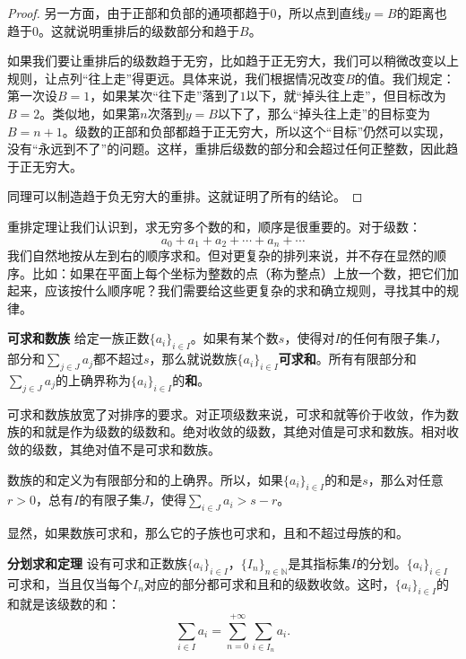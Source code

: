\documentclass[12pt,UTF8]{ctexbook}
\begin{document}
\begin{proof}
    另一方面，由于正部和负部的通项都趋于$0$，所以点到直线$y = B$的距离也趋于$0$。这就说明重排后的级数部分和趋于$B$。

    如果我们要让重排后的级数趋于无穷，比如趋于正无穷大，我们可以稍微改变以上规则，让点列“往上走”得更远。具体来说，我们根据情况改变$B$的值。我们规定：第一次设$B = 1$，如果某次“往下走”落到了$1$以下，就“掉头往上走”，但目标改为$B=2$。类似地，如果第$n$次落到$y = B$以下了，那么“掉头往上走”的目标变为$B = n + 1$。级数的正部和负部都趋于正无穷大，所以这个“目标”仍然可以实现，没有“永远到不了”的问题。这样，重排后级数的部分和会超过任何正整数，因此趋于正无穷大。

    同理可以制造趋于负无穷大的重排。这就证明了所有的结论。

\end{proof}

重排定理让我们认识到，求无穷多个数的和，顺序是很重要的。对于级数：
$$ a_0 + a_1 + a_2 + \cdots + a_n + \cdots $$
我们自然地按从左到右的顺序求和。但对更复杂的排列来说，并不存在显然的顺序。比如：如果在平面上每个坐标为整数的点（称为整点）上放一个数，把它们加起来，应该按什么顺序呢？我们需要给这些更复杂的求和确立规则，寻找其中的规律。

\begin{df}{\textbf{可求和数族}}
    给定一族正数$\{a_i\}_{i\in I}$。如果有某个数$s$，使得对$I$的任何有限子集$J$，部分和$\sum_{j\in J} a_j$都不超过$s$，那么就说数族$\{a_i\}_{i\in I}$\textbf{可求和}。所有有限部分和$\sum_{j\in J} a_j$的上确界称为$\{a_i\}_{i\in I}$的\textbf{和}。
\end{df}

可求和数族放宽了对排序的要求。对正项级数来说，可求和就等价于收敛，作为数族的和就是作为级数的级数和。绝对收敛的级数，其绝对值是可求和数族。相对收敛的级数，其绝对值不是可求和数族。

数族的和定义为有限部分和的上确界。所以，如果$\{a_i\}_{i\in I}$的和是$s$，那么对任意$r>0$，总有$I$的有限子集$J$，使得$\sum_{i\in J} a_i > s - r$。

显然，如果数族可求和，那么它的子族也可求和，且和不超过母族的和。

\begin{tm}{\textbf{分划求和定理}}
    设有可求和正数族$\{a_i\}_{i\in I}$，$\{I_n\}_{n\in\mathbb{N}}$是其指标集$I$的分划。$\{a_i\}_{i\in I}$可求和，当且仅当每个$I_n$对应的部分都可求和且和的级数收敛。这时，$\{a_i\}_{i\in I}$的和就是该级数的和：
    $$ \sum_{i\in I} a_i = \sum_{n=0}^{+\infty} \sum_{i\in I_n} a_i. $$
\end{tm}
\end{document}
